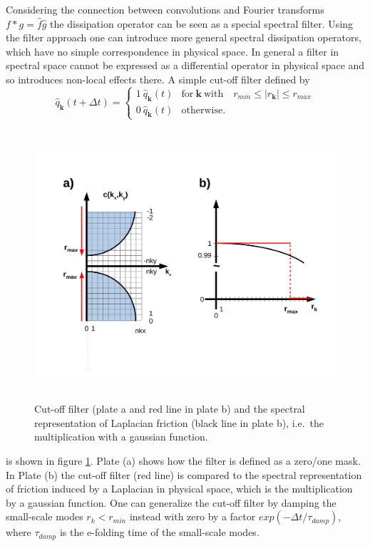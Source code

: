 Considering the connection between convolutions and Fourier transforms   
$f * g = \hat{f} \hat{g}$ the dissipation operator can be seen as a 
special spectral filter. Using the filter approach one can introduce more
general spectral dissipation operators, which have no simple
correspondence in physical space. In general a filter in spectral space
cannot be expressed as a differential operator in physical space and so
introduces non-local effects there. A simple cut-off filter defined by
\begin{equation} \label{eq_cutoffDiss}
 \hat{q}_{\mathbf{k}}(t + \Delta t)
  = 
 \left\{
  \begin{array}{lcl}
   1 \ \hat{q}_{\mathbf{k}}(t)
    & 
   \mbox{for} \ \mathbf{k} \ \mbox{with}  
    & 
   r_{min} \leq |r_{\mathbf{k}}| \leq r_{max}
   \\
   0 \ \hat{q}_{\mathbf{k}}(t)
    &
   \mbox{otherwise}.
    &
  \end{array}
 \right.
\end{equation}
\begin{figure}
   \includegraphics[height=10cm]{figures/diss_mask.pdf}
   \caption{Cut-off filter (plate a and red line in plate b)  and 
            the spectral representation of Laplacian friction (black line
            in plate b), i.e.\ the multiplication with a gaussian
            function.}
   \label{fig_diss_mask}
\end{figure}
is shown in figure \ref{fig_diss_mask}. Plate (a) shows how the
filter is defined as a zero/one mask. In Plate (b) the cut-off filter
(red line) is compared to the spectral representation of friction induced
by a Laplacian in physical space, which is the multiplication by a gaussian
function. One can generalize the cut-off filter by damping the small-scale
modes $r_{k} < r_{min}$ instead with zero by a factor 
$exp \left(- \Delta t/\tau_{damp} \right)$, where $\tau_{damp}$ is the
e-folding time of the small-scale modes. 
%
